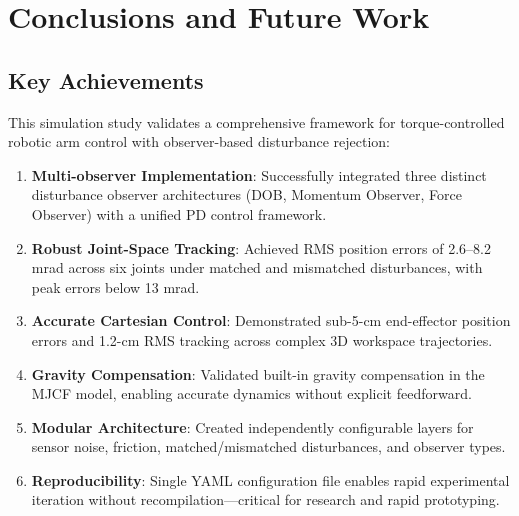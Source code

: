 \section{Conclusions and Future Work}

\subsection{Key Achievements}
This simulation study validates a comprehensive framework for torque-controlled robotic arm control with observer-based disturbance rejection:

\begin{enumerate}
    \item \textbf{Multi-observer Implementation}: Successfully integrated three distinct disturbance observer architectures (DOB, Momentum Observer, Force Observer) with a unified PD control framework.
    
    \item \textbf{Robust Joint-Space Tracking}: Achieved RMS position errors of 2.6--8.2 mrad across six joints under matched and mismatched disturbances, with peak errors below 13 mrad.
    
    \item \textbf{Accurate Cartesian Control}: Demonstrated sub-5-cm end-effector position errors and 1.2-cm RMS tracking across complex 3D workspace trajectories.
    
    \item \textbf{Gravity Compensation}: Validated built-in gravity compensation in the MJCF model, enabling accurate dynamics without explicit feedforward.
    
    \item \textbf{Modular Architecture}: Created independently configurable layers for sensor noise, friction, matched/mismatched disturbances, and observer types.
    
    \item \textbf{Reproducibility}: Single YAML configuration file enables rapid experimental iteration without recompilation---critical for research and rapid prototyping.
\end{enumerate}

